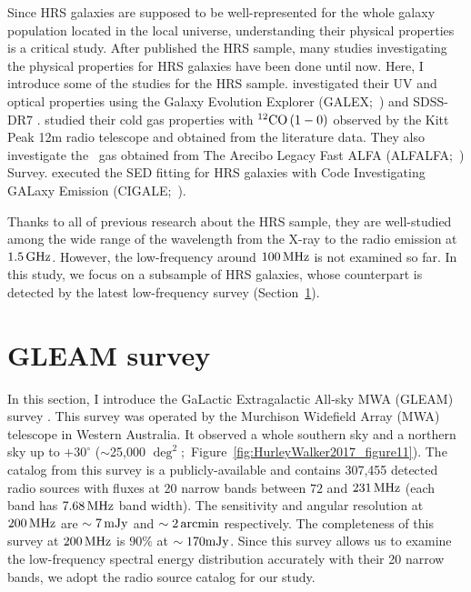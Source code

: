 Since HRS galaxies are supposed to be well-represented for the whole galaxy population located in the local universe, understanding their physical properties is a critical study.
After \citet{Boselli2010} published the HRS sample, many studies investigating the physical properties for HRS galaxies have been done until now.
Here, I introduce some of the studies for the HRS sample.
\citet{Cortese2012} investigated their UV and optical properties using the Galaxy Evolution Explorer (GALEX;~\citealt{Martin2005}) and SDSS-DR7 \citep{Abazajian2009}.
\citet{Boselli2014} studied their cold gas properties with $^{12}\mathrm{CO}\left(1-0\right)$ observed by the Kitt Peak 12m radio telescope and obtained from the literature data.
They also investigate the \nh~gas obtained from The Arecibo Legacy Fast ALFA (ALFALFA;~\citealt{Giovanelli2005, Haynes2011}) Survey.
\citet{Ciesla2014} executed the SED fitting for HRS galaxies with Code Investigating GALaxy Emission (CIGALE;~\citealt{Noll2009}).

Thanks to all of previous research about the HRS sample, they are well-studied among the wide range of the wavelength from the X-ray to the radio emission at $1.5\,\mathrm{GHz}$.
However, the low-frequency around $100\,\mathrm{MHz}$ is not examined so far.
In this study, we focus on a subsample of HRS galaxies, whose counterpart is detected by the latest low-frequency survey (Section~\ref{sec:gleamsurvey}).



\section{GLEAM survey}\label{sec:gleamsurvey}

In this section, I introduce the GaLactic Extragalactic All-sky MWA (GLEAM) survey \citep{Hurley-Walker2017a}.
This survey was operated by the Murchison Widefield Array (MWA) telescope \citep{Tingay2013a} in Western Australia.
It observed a whole southern sky and a northern sky up to $+30^{\circ}$ ($\sim$25,000 $\mathrm{\deg}^2$;~Figure~\ref{fig:HurleyWalker2017_figure11}).
The catalog from this survey is a publicly-available and contains 307,455 detected radio sources with fluxes at 20 narrow bands between $72$ and $231\,\mathrm{MHz}$ (each band has $7.68\,\mathrm{MHz}$ band width).
The sensitivity and angular resolution at $200\,\mathrm{MHz}$ are $\sim 7\,\mathrm{mJy}$ and $\sim 2\,\mathrm{arcmin}$ respectively.
The completeness of this survey at $200\,\mathrm{MHz}$ is $90\%$ at $\sim 170\mathrm{mJy}$.
Since this survey allows us to examine the low-frequency spectral energy distribution accurately with their 20 narrow bands, we adopt the radio source catalog for our study.

